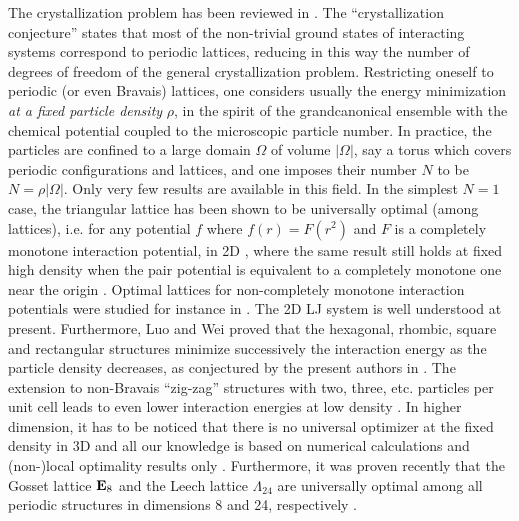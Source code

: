 \documentclass[12pt]{iopart}
\theoremstyle{definition}
\begin{document}
The crystallization problem has been reviewed in
\cite{BetDelPet,Blanc15,Bris05,Canizo24,Radin87}.
The ``crystallization conjecture'' states that most of the non-trivial
ground states of interacting systems correspond to periodic lattices,
reducing in this way the number of degrees of freedom of the general
crystallization problem.
Restricting oneself to periodic (or even Bravais) lattices,
one considers usually the energy minimization
{\em at a fixed particle density} $\rho$, in the spirit of the grandcanonical
ensemble with the chemical potential coupled to the microscopic particle number.
In practice, the particles are confined to a large domain $\Omega$ of volume
$\vert\Omega\vert$, say a torus which covers periodic configurations and
lattices, and one imposes their number $N$ to be $N=\rho\vert \Omega\vert$.
Only very few results are available in this field.
In the simplest $N=1$ case, the triangular lattice has been shown to be universally optimal (among lattices), i.e. for
any potential $f$ where $f(r)=F(r^2)$ and $F$ is a completely monotone interaction potential, in 2D \cite{Cohn07,Montgomery88},
where the same result still holds at fixed high density when the pair
potential is equivalent to a completely monotone one near the origin
\cite{Betermin15}.
Optimal lattices for non-completely monotone interaction potentials
were studied for instance in \cite{Betermin19,SunWeiZou24}.
The 2D LJ system is well understood at present.
Furthermore, Luo and Wei \cite{LuoWeiLJ22} proved that the hexagonal, rhombic,
square and rectangular structures minimize successively the interaction energy
as the particle density decreases, as conjectured by the present authors
in \cite{Betermin18,Travenec19}.
The extension to non-Bravais ``zig-zag'' structures with two, three, etc.
particles per unit cell leads to even lower interaction energies at low density
\cite{Travenec19}.
In higher dimension, it has to be noticed that there is no universal optimizer
at the fixed density in 3D \cite{Betermin17,SarStromb} and all our knowledge
is based on numerical calculations and (non-)local optimality results only \cite{Betermin23}.
Furthermore, it was proven recently that the Gosset lattice ${\bf E}_8$ and
the Leech lattice $\Lambda_{24}$ are universally optimal among all periodic
structures in dimensions 8 and 24, respectively \cite{Cohn22}.
\end{document}
